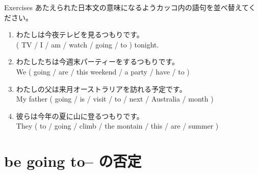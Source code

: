 \documentclass[aspectratio=169,xcolor={dvipsnames,table}]{beamer}
\begin{document}
\begin{frame}[plain]{Exercises}
 あたえられた日本文の意味になるようカッコ内の語句を並べ替えてください。

\begin{enumerate}
 \item わたしは今夜テレビを見るつもりです。\\
( TV / I / am / watch / going / to ) tonight.\\
 \item わたしたちは今週末パーティーをするつもりです。\\
We ( going / are / this weekend / a party / have / to )\\
 \item わたしの父は来月オーストラリアを訪れる予定です。\\
My father ( going / is / visit / to / next / Australia / month )\\
 \item 彼らは今年の夏に山に登るつもりです。\\
They ( to / going / climb / the montain / this / are / summer )\\
\end{enumerate}
\end{frame}

\section{be going to-- の否定}
\end{document}
